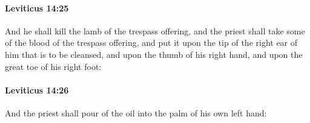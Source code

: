 		\paragraph{Leviticus 14:25} %
			\label{LEVITICUS-14-25}

			And he shall kill the lamb of the trespass offering, and the priest shall take some of the blood of the trespass offering, and put it upon the tip of the right ear of him that is to be cleansed, and upon the thumb of his right hand, and upon the great toe of his right foot:


		\paragraph{Leviticus 14:26} %
			\label{LEVITICUS-14-26}

			And the priest shall pour of the oil into the palm of his own left hand:


